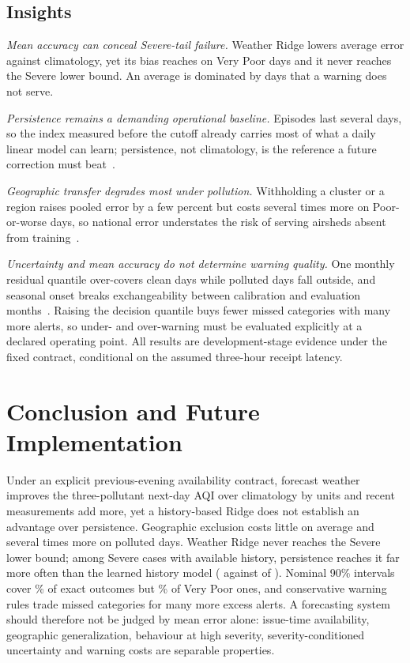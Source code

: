 \documentclass[conference,a4paper]{IEEEtran}
\begin{document}
\subsection{Insights}
\textit{Mean accuracy can conceal Severe-tail failure.} Weather Ridge lowers average error against climatology, yet its bias reaches \biasWxVeryPoor{} on Very Poor days and it never reaches the Severe lower bound. An average is dominated by days that a warning does not serve.

\textit{Persistence remains a demanding operational baseline.} Episodes last several days, so the index measured before the cutoff already carries most of what a daily linear model can learn; persistence, not climatology, is the reference a future correction must beat~\cite{casciaro2022}.

\textit{Geographic transfer degrades most under pollution.} Withholding a cluster or a region raises pooled error by a few percent but costs several times more on Poor-or-worse days, so national error understates the risk of serving airsheds absent from training~\cite{just2020}.

\textit{Uncertainty and mean accuracy do not determine warning quality.} One monthly residual quantile over-covers clean days while polluted days fall outside, and seasonal onset breaks exchangeability between calibration and evaluation months~\cite{barber2023}. Raising the decision quantile buys fewer missed categories with many more alerts, so under- and over-warning must be evaluated explicitly at a declared operating point. All results are development-stage evidence under the fixed contract, conditional on the assumed three-hour receipt latency.

\section{Conclusion and Future Implementation}
Under an explicit previous-evening availability contract, forecast weather improves the three-pollutant next-day AQI over climatology by \dWxClimAbs{} units and recent measurements add more, yet a history-based Ridge does not establish an advantage over persistence. Geographic exclusion costs little on average and several times more on polluted days. Weather Ridge never reaches the Severe lower bound; among Severe cases with available history, persistence reaches it far more often than the learned history model (\sevPersReach{} against \sevHistReach{} of \nHistSevere{}). Nominal 90\% intervals cover \covNinety\% of exact outcomes but \covSplitVeryPoor\% of Very Poor ones, and conservative warning rules trade missed categories for many more excess alerts. A forecasting system should therefore not be judged by mean error alone: issue-time availability, geographic generalization, behaviour at high severity, severity-conditioned uncertainty and warning costs are separable properties.
\end{document}
